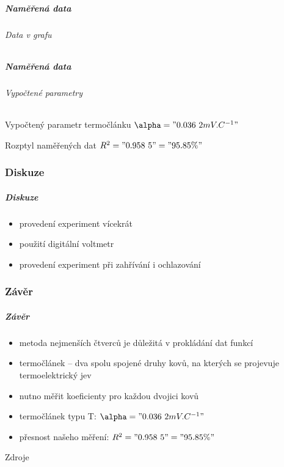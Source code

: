 \documentclass[smaller,aspectratio=1610,handout]{beamer}
\begin{document}
\begin{frame}
	\frametitle{Naměřená data}
	\framesubtitle{Data v grafu}
	\hspace{0cm}\vfill
	\small
	\vfill
\end{frame}
\begin{frame}
	\frametitle{Naměřená data}
	\framesubtitle{Vypočtené parametry}
	\begin{block}{Vypočtený parametr termočlánku}
		\centering $\alpha = "0.036~2 mV.C^{-1}"$
	\end{block}
	\begin{block}{Rozptyl naměřených dat}
		\centering $R^2="0.958~5"="95.85 \%"$
	\end{block}
\end{frame}

\section{Diskuze}
\begin{frame}
	\frametitle{Diskuze}
	\begin{itemize}
		\item provedení experiment vícekrát
		\item použití digitální voltmetr
		\item provedení experiment při zahřívání i ochlazování
	\end{itemize}
\end{frame}

\section{Závěr}
\begin{frame}
	\frametitle{Závěr}
	\begin{itemize}
		\item metoda nejmenších čtverců je důležitá v prokládání dat funkcí
		\item termočlánek -- dva spolu spojené druhy kovů, na kterých se
			projevuje termoelektrický jev
		\item nutno měřit koeficienty pro každou dvojici kovů
		\item termočlánek typu T: $\alpha = "0.036~2 mV.C^{-1}"$
		\item přesnost našeho měření: $R^2="0.958~5"="95.85 \%"$
	\end{itemize}
\end{frame}

\begin{frame}[allowframebreaks=.85]{Zdroje}
	\nocite{*}
    \printbibliography[heading=none]
\end{frame}

\part{}

\begin{frame}[plain]
	\titlepage
\end{frame}
\end{document}
